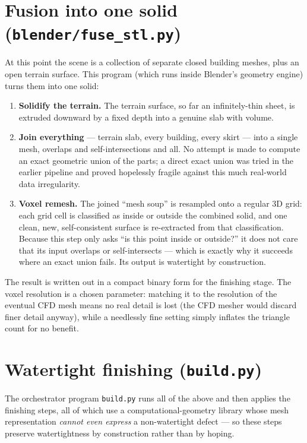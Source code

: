 \documentclass[11pt]{article}
\newcommand{\code}[1]{\texttt{#1}}
\begin{document}
\section{Fusion into one solid (\code{blender/fuse\_stl.py})}
\label{sec:fuse}

At this point the scene is a collection of separate closed building meshes, plus an open terrain
surface. This program (which runs inside Blender's geometry engine) turns them into one solid:

\begin{enumerate}[leftmargin=1.4cm]
  \item \textbf{Solidify the terrain.} The terrain surface, so far an infinitely-thin sheet, is
    extruded downward by a fixed depth into a genuine slab with volume.
  \item \textbf{Join everything} --- terrain slab, every building, every skirt --- into a single
    mesh, overlaps and self-intersections and all. No attempt is made to compute an exact
    geometric union of the parts; a direct exact union was tried in the earlier pipeline and
    proved hopelessly fragile against this much real-world data irregularity.
  \item \textbf{Voxel remesh.} The joined ``mesh soup'' is resampled onto a regular 3D grid: each
    grid cell is classified as inside or outside the combined solid, and one clean, new,
    self-consistent surface is re-extracted from that classification. Because this step only asks
    ``is this point inside or outside?'' it does not care that its input overlaps or
    self-intersects --- which is exactly why it succeeds where an exact union fails. Its output is
    watertight by construction.
\end{enumerate}

The result is written out in a compact binary form for the finishing stage. The voxel resolution
is a chosen parameter: matching it to the resolution of the eventual CFD mesh means no real
detail is lost (the CFD mesher would discard finer detail anyway), while a needlessly fine
setting simply inflates the triangle count for no benefit.

\section{Watertight finishing (\code{build.py})}
\label{sec:finish}

The orchestrator program \code{build.py} runs all of the above and then applies the finishing
steps, all of which use a computational-geometry library whose mesh representation
\emph{cannot even express} a non-watertight defect --- so these steps preserve watertightness by
construction rather than by hoping.
\end{document}
